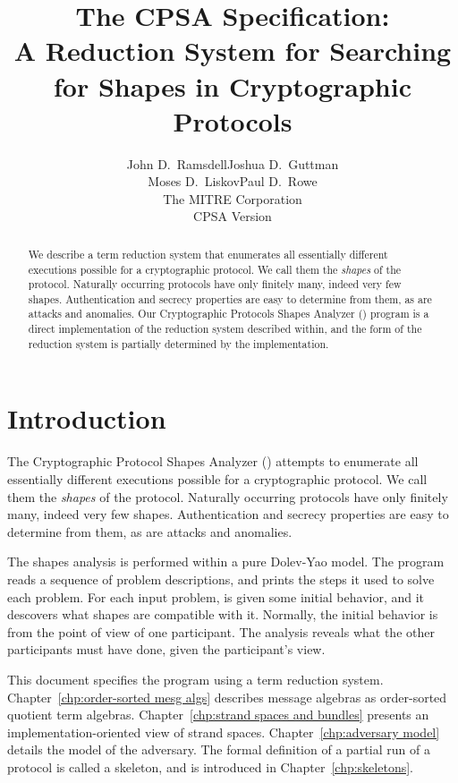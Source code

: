 \documentclass[12pt]{report}
\title{The CPSA Specification:\\
A Reduction System for Searching for Shapes in Cryptographic Protocols}
\author{John D.~Ramsdell\qquad Joshua D.~Guttman\\
  \quad Moses D.~Liskov\qquad Paul D.~Rowe\\
  The MITRE Corporation\\ CPSA Version \version}
\theoremstyle{definition}
\begin{document}
\maketitle
\cpsacopying

\tableofcontents

\begin{abstract}
We describe a term reduction system that enumerates all essentially
different executions possible for a cryptographic protocol.  We call
them the \emph{shapes} of the protocol.  Naturally occurring protocols
have only finitely many, indeed very few shapes.  Authentication and
secrecy properties are easy to determine from them, as are attacks and
anomalies.  Our Cryptographic Protocols Shapes Analyzer ({\cpsa})
program is a direct implementation of the reduction system described
within, and the form of the reduction system is partially determined
by the implementation.
\end{abstract}

\chapter{Introduction}

The Cryptographic Protocol Shapes Analyzer ({\cpsa}) attempts to
enumerate all essentially different executions possible for a
cryptographic protocol.  We call them the \emph{shapes} of the
protocol.  Naturally occurring protocols have only finitely many,
indeed very few shapes.  Authentication and secrecy properties are
easy to determine from them, as are attacks and anomalies.

The shapes analysis is performed within a pure Dolev-Yao model.  The
{\cpsa} program reads a sequence of problem descriptions, and prints
the steps it used to solve each problem.  For each input problem,
{\cpsa} is given some initial behavior, and it descovers what shapes
are compatible with it.  Normally, the initial behavior is from the
point of view of one participant.  The analysis reveals what the other
participants must have done, given the participant's view.

This document specifies the {\cpsa} program using a term reduction
system.  Chapter~\ref{chp:order-sorted mesg algs} describes message
algebras as order-sorted quotient term algebras.
Chapter~\ref{chp:strand spaces and bundles} presents an
implementation-oriented view of strand spaces.
Chapter~\ref{chp:adversary model} details the model of the adversary.
The formal definition of a partial run of a protocol is called a
skeleton, and is introduced in Chapter~\ref{chp:skeletons}.
\end{document}
